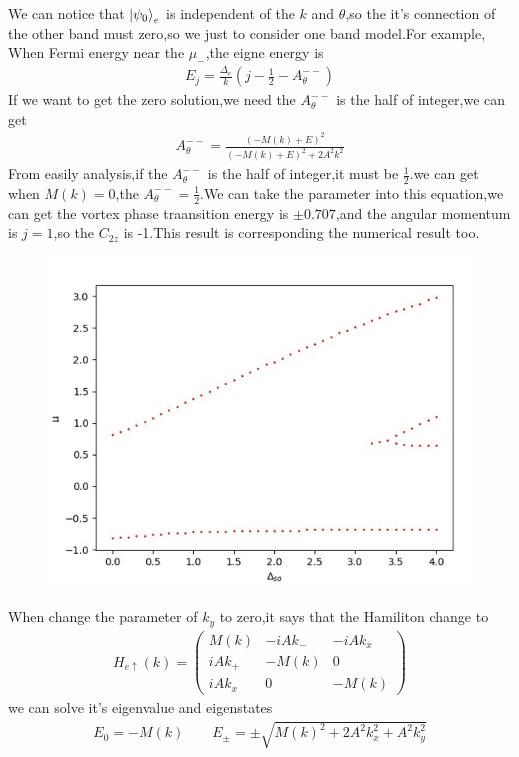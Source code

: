 \documentclass[4pt]{article}
\begin{document}
We can notice that $\ket{\psi_0}_e$ is independent of the $k$ and $\theta$,so the it's connection of the other band must zero,so we just to consider one band model.For example, When Fermi energy near the $\mu_{-}$,the eigne energy is   
\begin{align}
	E_j=\frac{\Delta_e}{k}(j-\frac{1}{2}-A_{\theta}^{--})
\end{align}
If we want to get the zero solution,we need the $A_{\theta}^{--}$ is the half of integer,we can get 
\begin{align}
	A_{\theta}^{--}=\frac{(-M(k)+E)^2}{(-M(k)+E)^2+2A^2k^2}
\end{align}
From easily analysis,if the  $A_{\theta}^{--}$ is the half of integer,it must be $\frac{1}{2}$.we can get when $M(k)=0$,the  $A_{\theta}^{--}=\frac{1}{2}$.We can take the parameter into this equation,we can get the vortex phase traansition energy is $\pm 0.707$,and the angular momentum is $j=1$,so the $C_{2z}$ is -1.This result is  corresponding the numerical result too.
\begin{figure}[H]
	\centering
	\includegraphics[scale=0.6]{figure/6}
\end{figure}

When change the parameter of $k_y$ to zero,it says that the Hamiliton change to 
\begin{align}
		H_{e\uparrow}(k)=
		\begin{pmatrix}
					M(k) & -iAk_{-} &-iAk_{x}\\
					iAk_{+} &-M(k) &0\\
					iAk_{x}&0&-M(k)
		\end{pmatrix}
\end{align}
we can solve it's eigenvalue and eigenstates
\begin{align}
	E_{0}=-M(k) \qquad E_{\pm}=\pm \sqrt{M(k)^2+2A^2k_x^2+A^2k_y^2}
\end{align}
\end{document}
